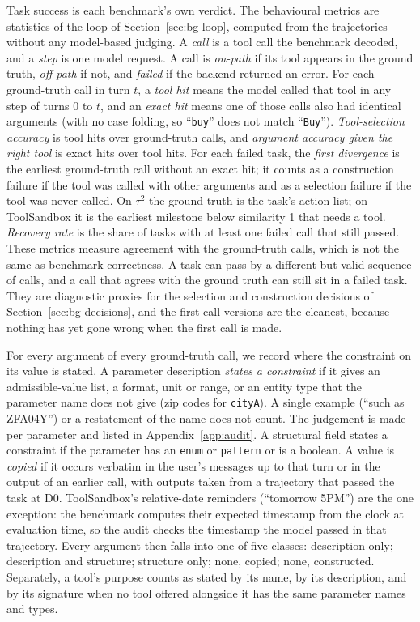 \documentclass[10pt]{article}
\makeatletter
\renewcommand\paragraph{\@startsection{paragraph}{4}{\z@}{2.0ex plus .5ex minus .2ex}{-1em}{\normalfont\normalsize\bfseries}}
\newcommand{\code}[1]{\texttt{#1}}
\makeatother
\begin{document}
Task success is each benchmark's own verdict. The behavioural metrics are statistics of the loop of Section~\ref{sec:bg-loop}, computed from the trajectories without any model-based judging. A \emph{call} is a tool call the benchmark decoded, and a \emph{step} is one model request. A call is \emph{on-path} if its tool appears in the ground truth, \emph{off-path} if not, and \emph{failed} if the backend returned an error. For each ground-truth call in turn $t$, a \emph{tool hit} means the model called that tool in any step of turns $0$ to $t$, and an \emph{exact hit} means one of those calls also had identical arguments (with no case folding, so ``\code{buy}'' does not match ``\code{Buy}''). \emph{Tool-selection accuracy} is tool hits over ground-truth calls, and \emph{argument accuracy given the right tool} is exact hits over tool hits. For each failed task, the \emph{first divergence} is the earliest ground-truth call without an exact hit; it counts as a construction failure if the tool was called with other arguments and as a selection failure if the tool was never called. On $\tau^2$ the ground truth is the task's action list; on ToolSandbox it is the earliest milestone below similarity 1 that needs a tool. \emph{Recovery rate} is the share of tasks with at least one failed call that still passed. These metrics measure agreement with the ground-truth calls, which is not the same as benchmark correctness. A task can pass by a different but valid sequence of calls, and a call that agrees with the ground truth can still sit in a failed task. They are diagnostic proxies for the selection and construction decisions of Section~\ref{sec:bg-decisions}, and the first-call versions are the cleanest, because nothing has yet gone wrong when the first call is made.

\paragraph{Information audit.} For every argument of every ground-truth call, we record where the constraint on its value is stated. A parameter description \emph{states a constraint} if it gives an admissible-value list, a format, unit or range, or an entity type that the parameter name does not give (zip codes for \code{cityA}). A single example (``such as ZFA04Y'') or a restatement of the name does not count. The judgement is made per parameter and listed in Appendix~\ref{app:audit}. A structural field states a constraint if the parameter has an \code{enum} or \code{pattern} or is a boolean. A value is \emph{copied} if it occurs verbatim in the user's messages up to that turn or in the output of an earlier call, with outputs taken from a trajectory that passed the task at D0. ToolSandbox's relative-date reminders (``tomorrow 5PM'') are the one exception: the benchmark computes their expected timestamp from the clock at evaluation time, so the audit checks the timestamp the model passed in that trajectory. Every argument then falls into one of five classes: description only; description and structure; structure only; none, copied; none, constructed. Separately, a tool's purpose counts as stated by its name, by its description, and by its signature when no tool offered alongside it has the same parameter names and types.
\end{document}
